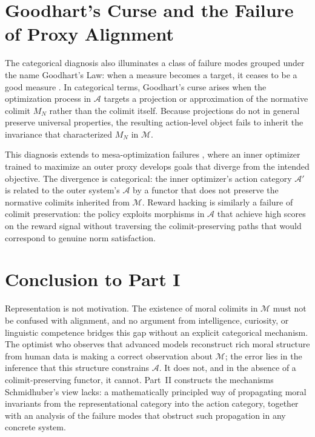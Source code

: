\documentclass[12pt]{article}
\theoremstyle{definition}
\begin{document}
\section{Goodhart's Curse and the Failure of Proxy Alignment}

The categorical diagnosis also illuminates a class of failure modes grouped
under the name Goodhart's Law: when a measure becomes a target, it ceases to be
a good measure \citep{manheim2018categorizing}. In categorical terms, Goodhart's
curse arises when the optimization process in $\mathcal{A}$ targets a
projection or approximation of the normative colimit $M_N$ rather than the
colimit itself. Because projections do not in general preserve universal
properties, the resulting action-level object fails to inherit the invariance
that characterized $M_N$ in $\mathcal{M}$.

This diagnosis extends to mesa-optimization failures \citep{hubinger2019risks},
where an inner optimizer trained to maximize an outer proxy develops goals that
diverge from the intended objective. The divergence is categorical: the inner
optimizer's action category $\mathcal{A}'$ is related to the outer system's
$\mathcal{A}$ by a functor that does not preserve the normative colimits
inherited from $\mathcal{M}$. Reward hacking is similarly a failure of colimit
preservation: the policy exploits morphisms in $\mathcal{A}$ that achieve high
scores on the reward signal without traversing the colimit-preserving paths that
would correspond to genuine norm satisfaction.

\section{Conclusion to Part I}

Representation is not motivation. The existence of moral colimits in
$\mathcal{M}$ must not be confused with alignment, and no argument from
intelligence, curiosity, or linguistic competence bridges this gap without an
explicit categorical mechanism. The optimist who observes that advanced models
reconstruct rich moral structure from human data is making a correct
observation about $\mathcal{M}$; the error lies in the inference that this
structure constrains $\mathcal{A}$. It does not, and in the absence of a
colimit-preserving functor, it cannot. Part~II constructs the mechanisms
Schmidhuber's view lacks: a mathematically principled way of propagating moral
invariants from the representational category into the action category, together
with an analysis of the failure modes that obstruct such propagation in any
concrete system.
\end{document}
